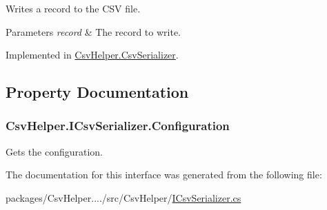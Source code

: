Writes a record to the C\-S\-V file. 


\begin{DoxyParams}{Parameters}
{\em record} & The record to write.\\
\hline
\end{DoxyParams}


Implemented in \hyperlink{a00059_aefad906acd048863d3dd414651a44793}{Csv\-Helper.\-Csv\-Serializer}.



\subsection{Property Documentation}
\hypertarget{a00092_a54d241fe87517707b6f85c30fe8b3a95}{
\subsubsection[{Configuration}]{ Csv\-Helper.\-I\-Csv\-Serializer.\-Configuration\hspace{0.3cm}{\ttfamily [get]}}}\label{a00092_a54d241fe87517707b6f85c30fe8b3a95}


Gets the configuration. 



The documentation for this interface was generated from the following file\-:\begin{DoxyCompactItemize}
\item 
packages/\-Csv\-Helper..../src/\-Csv\-Helper/\hyperlink{a00213}{I\-Csv\-Serializer.\-cs}\end{DoxyCompactItemize}
